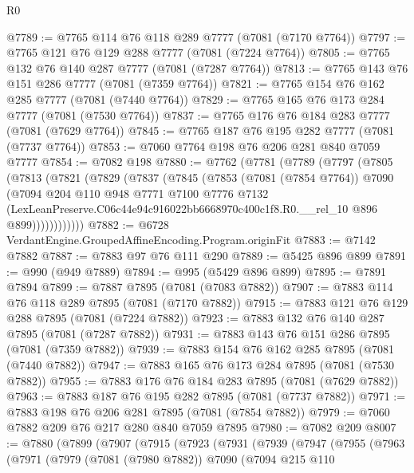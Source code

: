 \begin{lexlean}{R0}
\begin{coremodule}
@7789 := @7765 @114 @76 @118 @289 @7777 (@7081 (@7170 @7764))
@7797 := @7765 @121 @76 @129 @288 @7777 (@7081 (@7224 @7764))
@7805 := @7765 @132 @76 @140 @287 @7777 (@7081 (@7287 @7764))
@7813 := @7765 @143 @76 @151 @286 @7777 (@7081 (@7359 @7764))
@7821 := @7765 @154 @76 @162 @285 @7777 (@7081 (@7440 @7764))
@7829 := @7765 @165 @76 @173 @284 @7777 (@7081 (@7530 @7764))
@7837 := @7765 @176 @76 @184 @283 @7777 (@7081 (@7629 @7764))
@7845 := @7765 @187 @76 @195 @282 @7777 (@7081 (@7737 @7764))
@7853 := @7060 @7764 @198 @76 @206 @281 @840 @7059 @7777
@7854 := @7082 @198
@7880 := @7762
    (@7781
      (@7789
        (@7797
          (@7805
            (@7813
              (@7821
                (@7829
                  (@7837
                    (@7845
                      (@7853
                        (@7081 (@7854 @7764))
                        @7090
                        (@7094
                          @204
                          @110
                          @948
                          @7771
                          @7100
                          @7776
                          @7132
                          (LexLeanPreserve.C06c44e94c916022bb6668970c400c1f8.R0.__rel_10
                            @896
                            @899))))))))))))
@7882 := @6728 VerdantEngine.GroupedAffineEncoding.Program.originFit
@7883 := @7142 @7882
@7887 := @7883 @97 @76 @111 @290
@7889 := @5425 @896 @899
@7891 := @990 (@949 @7889)
@7894 := @995 (@5429 @896 @899)
@7895 := @7891 @7894
@7899 := @7887 @7895 (@7081 (@7083 @7882))
@7907 := @7883 @114 @76 @118 @289 @7895 (@7081 (@7170 @7882))
@7915 := @7883 @121 @76 @129 @288 @7895 (@7081 (@7224 @7882))
@7923 := @7883 @132 @76 @140 @287 @7895 (@7081 (@7287 @7882))
@7931 := @7883 @143 @76 @151 @286 @7895 (@7081 (@7359 @7882))
@7939 := @7883 @154 @76 @162 @285 @7895 (@7081 (@7440 @7882))
@7947 := @7883 @165 @76 @173 @284 @7895 (@7081 (@7530 @7882))
@7955 := @7883 @176 @76 @184 @283 @7895 (@7081 (@7629 @7882))
@7963 := @7883 @187 @76 @195 @282 @7895 (@7081 (@7737 @7882))
@7971 := @7883 @198 @76 @206 @281 @7895 (@7081 (@7854 @7882))
@7979 := @7060 @7882 @209 @76 @217 @280 @840 @7059 @7895
@7980 := @7082 @209
@8007 := @7880
    (@7899
      (@7907
        (@7915
          (@7923
            (@7931
              (@7939
                (@7947
                  (@7955
                    (@7963
                      (@7971
                        (@7979
                          (@7081 (@7980 @7882))
                          @7090
                          (@7094
                            @215
                            @110

\end{coremodule}
\end{lexlean}
